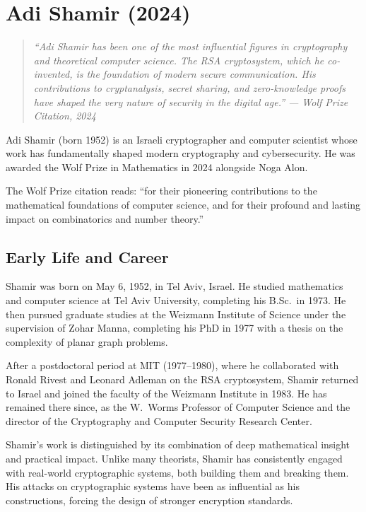 \providecommand{\poly}{\operatorname{poly}}
\providecommand{\BPP}{\operatorname{BPP}}

\chapter{Adi Shamir (2024)}

\begin{quote}
\it ``Adi Shamir has been one of the most influential figures in cryptography and theoretical computer science. The RSA cryptosystem, which he co-invented, is the foundation of modern secure communication. His contributions to cryptanalysis, secret sharing, and zero-knowledge proofs have shaped the very nature of security in the digital age.'' --- Wolf Prize Citation, 2024
\end{quote}

Adi Shamir (born 1952) is an Israeli cryptographer and computer scientist whose work has fundamentally shaped modern cryptography and cybersecurity. He was awarded the Wolf Prize in Mathematics in 2024 alongside Noga Alon.

The Wolf Prize citation reads: ``for their pioneering contributions to the mathematical foundations of computer science, and for their profound and lasting impact on combinatorics and number theory.''

\section{Early Life and Career}

Shamir was born on May 6, 1952, in Tel Aviv, Israel. He studied mathematics and computer science at Tel Aviv University, completing his B.Sc.\ in 1973. He then pursued graduate studies at the Weizmann Institute of Science under the supervision of Zohar Manna, completing his PhD in 1977 with a thesis on the complexity of planar graph problems.

After a postdoctoral period at MIT (1977--1980), where he collaborated with Ronald Rivest and Leonard Adleman on the RSA cryptosystem, Shamir returned to Israel and joined the faculty of the Weizmann Institute in 1983. He has remained there since, as the W.\ Worms Professor of Computer Science and the director of the Cryptography and Computer Security Research Center.

Shamir's work is distinguished by its combination of deep mathematical insight and practical impact. Unlike many theorists, Shamir has consistently engaged with real-world cryptographic systems, both building them and breaking them. His attacks on cryptographic systems have been as influential as his constructions, forcing the design of stronger encryption standards.

